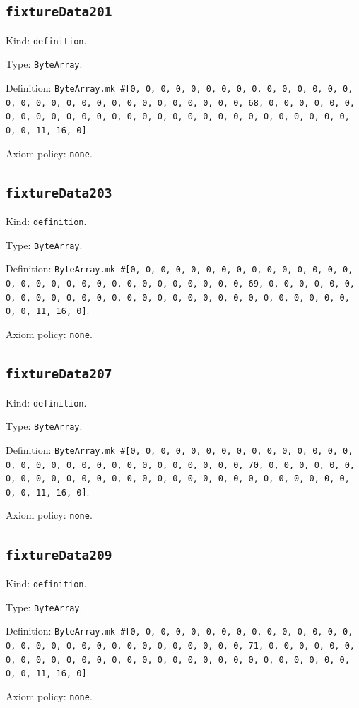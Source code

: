 \documentclass[11pt]{article}
\begin{document}
\subsection*{\texttt{fixtureData201}}
\noindent Kind: \texttt{definition}.\par
\noindent Type: \texttt{ByteArray}.\par
\noindent Definition: \texttt{ByteArray.mk \#[0, 0, 0, 0, 0, 0, 0, 0, 0, 0, 0, 0, 0, 0, 0, 0, 0, 0, 0, 0, 0, 0, 0, 0, 0, 0, 0, 0, 0, 0, 0, 68, 0, 0, 0, 0, 0, 0, 0, 0, 0, 0, 0, 0, 0, 0, 0, 0, 0, 0, 0, 0, 0, 0, 0, 0, 0, 0, 0, 0, 0, 0, 0, 11, 16, 0]}.\par
\noindent Axiom policy: \texttt{none}.\par
\subsection*{\texttt{fixtureData203}}
\noindent Kind: \texttt{definition}.\par
\noindent Type: \texttt{ByteArray}.\par
\noindent Definition: \texttt{ByteArray.mk \#[0, 0, 0, 0, 0, 0, 0, 0, 0, 0, 0, 0, 0, 0, 0, 0, 0, 0, 0, 0, 0, 0, 0, 0, 0, 0, 0, 0, 0, 0, 0, 69, 0, 0, 0, 0, 0, 0, 0, 0, 0, 0, 0, 0, 0, 0, 0, 0, 0, 0, 0, 0, 0, 0, 0, 0, 0, 0, 0, 0, 0, 0, 0, 11, 16, 0]}.\par
\noindent Axiom policy: \texttt{none}.\par
\subsection*{\texttt{fixtureData207}}
\noindent Kind: \texttt{definition}.\par
\noindent Type: \texttt{ByteArray}.\par
\noindent Definition: \texttt{ByteArray.mk \#[0, 0, 0, 0, 0, 0, 0, 0, 0, 0, 0, 0, 0, 0, 0, 0, 0, 0, 0, 0, 0, 0, 0, 0, 0, 0, 0, 0, 0, 0, 0, 70, 0, 0, 0, 0, 0, 0, 0, 0, 0, 0, 0, 0, 0, 0, 0, 0, 0, 0, 0, 0, 0, 0, 0, 0, 0, 0, 0, 0, 0, 0, 0, 11, 16, 0]}.\par
\noindent Axiom policy: \texttt{none}.\par
\subsection*{\texttt{fixtureData209}}
\noindent Kind: \texttt{definition}.\par
\noindent Type: \texttt{ByteArray}.\par
\noindent Definition: \texttt{ByteArray.mk \#[0, 0, 0, 0, 0, 0, 0, 0, 0, 0, 0, 0, 0, 0, 0, 0, 0, 0, 0, 0, 0, 0, 0, 0, 0, 0, 0, 0, 0, 0, 0, 71, 0, 0, 0, 0, 0, 0, 0, 0, 0, 0, 0, 0, 0, 0, 0, 0, 0, 0, 0, 0, 0, 0, 0, 0, 0, 0, 0, 0, 0, 0, 0, 11, 16, 0]}.\par
\noindent Axiom policy: \texttt{none}.\par
\end{document}
